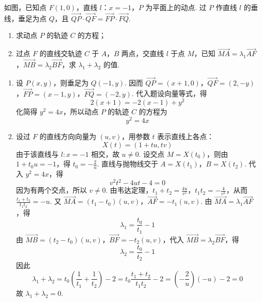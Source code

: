 \begin{problem}
如图，已知点 \(F(1,0)\)，直线 \(l\)：\(x = -1\)，\(P\) 为平面上的动点. 过 \(P\) 作直线 \(l\) 的垂线，垂足为点 \(Q\)，且 \(\overrightarrow{QP} \cdot \overrightarrow{QF} = \overrightarrow{FP} \cdot \overrightarrow{FQ}\).

\begin{enumerate}
\item 求动点 \(P\) 的轨迹 \(C\) 的方程；
\item 过点 \(F\) 的直线交轨迹 \(C\) 于 \(A\)，\(B\) 两点，交直线 \(l\) 于点 \(M\)，已知 \(\overrightarrow{MA} = \lambda_1 \overrightarrow{AF}\)，\(\overrightarrow{MB} = \lambda_2 \overrightarrow{BF}\)，求 \(\lambda_1 + \lambda_2\) 的值.
\end{enumerate}

\end{problem}

\begin{solution}
\begin{enumerate}
\item 设 \(P(x,y)\)，则垂足为 \(Q(-1,y)\). 因而 \(\overrightarrow{QP}=(x+1,0)\)，\(\overrightarrow{QF}=(2,-y)\)，\(\overrightarrow{FP}=(x-1,y)\)，\(\overrightarrow{FQ}=(-2,y)\).
代入题设向量等式，得
\[
2(x+1)=-2(x-1)+y^{2}
\]
化简得 \(y^{2}=4x\)，所以动点 \(P\) 的轨迹 \(C\) 的方程为
\[
y^{2}=4x
\]

\item 设过 \(F\) 的直线方向向量为 \((u,v)\)，用参数 \(t\) 表示直线上各点：
\[
X(t)=(1+tu,tv)
\]
由于该直线与 \(l\colon x=-1\) 相交，故 \(u\neq0\). 设交点 \(M=X(t_{0})\)，则由 \(1+t_{0}u=-1\)，得 \(t_{0}=-\frac{2}{u}\).
直线与抛物线交于 \(A=X(t_{1})\)，\(B=X(t_{2})\). 代入 \(y^{2}=4x\)，得
\[
v^{2}t^{2}-4ut-4=0
\]
因为有两个交点，所以 \(v\neq0\). 由韦达定理，\(t_{1}+t_{2}=\frac{4u}{v^{2}}\)，\(t_{1}t_{2}=-\frac{4}{v^{2}}\)，从而 \(\frac{t_{1}+t_{2}}{t_{1}t_{2}}=-u\).
又 \(\overrightarrow{MA}=(t_{1}-t_{0})(u,v)\)，\(\overrightarrow{AF}=-t_{1}(u,v)\).
由 \(\overrightarrow{MA}=\lambda_{1}\overrightarrow{AF}\)，得
\[
\lambda_{1}=\frac{t_{0}}{t_{1}}-1
\]
由 \(\overrightarrow{MB}=(t_{2}-t_{0})(u,v)\)，\(\overrightarrow{BF}=-t_{2}(u,v)\)，代入 \(\overrightarrow{MB}=\lambda_{2}\overrightarrow{BF}\)，得
\[
\lambda_{2}=\frac{t_{0}}{t_{2}}-1
\]
因此
\[
\lambda_{1}+\lambda_{2}
=t_{0}\left(\frac{1}{t_{1}}+\frac{1}{t_{2}}\right)-2
=t_{0}\frac{t_{1}+t_{2}}{t_{1}t_{2}}-2
=\left(-\frac{2}{u}\right)(-u)-2=0
\]
故 \(\lambda_{1}+\lambda_{2}=0\).
\end{enumerate}
\end{solution}

